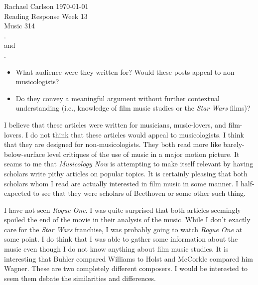 \documentclass[12pt]{article}
\begin{document}
\noindent Rachael Carlson \hfill \today\\
\noindent Reading Response Week 13\\
\noindent Music 314\\

\noindent {}.\\

\noindent and\\

\noindent {}.\\

\begin{itemize}
\item What audience were they written for? Would these posts appeal to
  non-musicologists?
\item Do they convey a meaningful argument without further contextual
  understanding (i.e., knowledge of film music studies or the \emph{Star Wars}
  films)?
\end{itemize}

I believe that these articles were written for musicians, music-lovers, and
film-lovers. I do not think that these articles would appeal to
musicologists. I think that they are designed for non-musicologists. They both
read more like barely-below-surface level critiques of the use of music in a
major motion picture. It seams to me that \emph{Musicology Now} is attempting
to make itself relevant by having scholars write pithy articles on popular
topics. It is certainly pleasing that both scholars whom I read are actually
interested in film music in some manner. I half-expected to see that they were
scholars of Beethoven or some other such thing.

I have not seen \emph{Rogue One}. I was quite surprised that both articles
seemingly spoiled the end of the movie in their analysis of the music. While I
don't exactly care for the \emph{Star Wars} franchise, I was probably going to
watch \emph{Rogue One} at some point. I do think that I was able to gather
some information about the music even though I do not know anything about film
music studies. It is interesting that Buhler compared Williams to Holst and
McCorkle compared him Wagner. These are two completely different composers. I
would be interested to seem them debate the similarities and differences.
\end{document}
